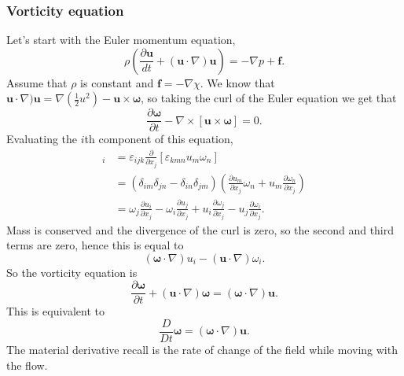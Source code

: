 \documentclass{article}
\begin{document}
\subsubsection{Vorticity equation}
Let's start with the Euler momentum equation,
\[
	\rho\left(\frac{\partial \mathbf u}{dt} +(\mathbf u \cdot \nabla)\mathbf u \right) = -\nabla p+\mathbf f.
\]
Assume that $ \rho $ is constant and $ \mathbf f = -\nabla\chi $. We know that $ \mathbf u \cdot\nabla)\mathbf u = \nabla(\frac 12 u^2) - \mathbf u\times\boldsymbol\omega $, so taking the curl of the Euler equation we get that
\[
	\frac{\partial\boldsymbol\omega}{\partial t} -\nabla\times[\mathbf u \times \boldsymbol\omega]=0.
\]
Evaluating the $ i $th component of this equation,
\begin{align*}
	[\nabla\times(\mathbf u\times\boldsymbol\omega)]_i &= \varepsilon_{ijk} \frac{\partial}{\partial x_j} [\varepsilon_{kmn}u_m\omega_n]\\
	&= (\delta_{im}\delta_{jn}-\delta_{in}\delta_{jm})\left(\frac{\partial u_m}{\partial x_j}\omega_n + u_m\frac{\partial \omega_n}{\partial x_j}\right)\\
	&= \omega_j \frac{\partial u_i}{\partial x_j} - \omega_i \frac{\partial u_j}{\partial x_j}+u_i\frac{\partial\omega_j}{\partial x_j}-u_j\frac{\partial \omega_i}{\partial x_j}.
\end{align*}
Mass is conserved and the divergence of the curl is zero, so the second and third terms are zero, hence this is equal to
\[
	(\boldsymbol\omega\cdot \nabla)u_i-(\mathbf u \cdot\nabla)\omega_i.
\]
So the vorticity equation is
\[
	\frac{\partial \boldsymbol\omega}{\partial t} + (\mathbf u \cdot \nabla)\boldsymbol\omega = (\boldsymbol\omega\cdot\nabla)\mathbf u.
\]
This is equivalent to
\[
	\frac{D}{Dt}\boldsymbol\omega = (\boldsymbol\omega \cdot\nabla)\mathbf u.
\]
The material derivative recall is the rate of change of the field while moving with the flow. 
\end{document}
